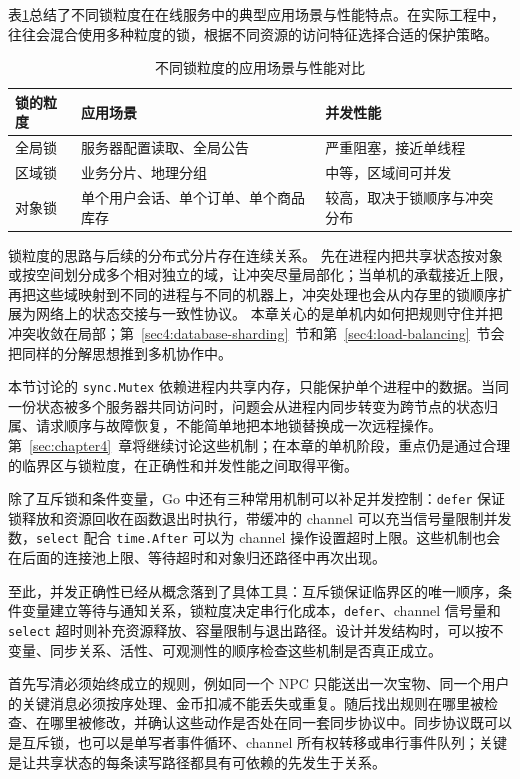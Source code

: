 表\ref{tab:lock-granularity}总结了不同锁粒度在在线服务中的典型应用场景与性能特点。在实际工程中，往往会混合使用多种粒度的锁，根据不同资源的访问特征选择合适的保护策略。

\begin{table}[H]
\centering
\caption{不同锁粒度的应用场景与性能对比}
\label{tab:lock-granularity}
\begin{tabular}{p{3cm}p{5cm}p{4cm}}
\hline
锁的粒度 & 应用场景 & 并发性能 \\
\hline
全局锁 & 服务器配置读取、全局公告 & 严重阻塞，接近单线程 \\
区域锁 & 业务分片、地理分组 & 中等，区域间可并发 \\
对象锁 & 单个用户会话、单个订单、单个商品库存 & 较高，取决于锁顺序与冲突分布 \\
\hline
\end{tabular}
\end{table}

锁粒度的思路与后续的分布式分片存在连续关系。
先在进程内把共享状态按对象或按空间划分成多个相对独立的域，让冲突尽量局部化；当单机的承载接近上限，再把这些域映射到不同的进程与不同的机器上，冲突处理也会从内存里的锁顺序扩展为网络上的状态交接与一致性协议。
本章关心的是单机内如何把规则守住并把冲突收敛在局部；第~\ref{sec4:database-sharding}~节和第~\ref{sec4:load-balancing}~节会把同样的分解思想推到多机协作中。

本节讨论的 \texttt{sync.Mutex} 依赖进程内共享内存，只能保护单个进程中的数据。当同一份状态被多个服务器共同访问时，问题会从进程内同步转变为跨节点的状态归属、请求顺序与故障恢复，不能简单地把本地锁替换成一次远程操作。第~\ref{sec:chapter4}~章将继续讨论这些机制；在本章的单机阶段，重点仍是通过合理的临界区与锁粒度，在正确性和并发性能之间取得平衡。

除了互斥锁和条件变量，Go 中还有三种常用机制可以补足并发控制：\texttt{defer} 保证锁释放和资源回收在函数退出时执行，带缓冲的 channel 可以充当信号量限制并发数，\texttt{select} 配合 \texttt{time.After} 可以为 channel 操作设置超时上限。这些机制也会在后面的连接池上限、等待超时和对象归还路径中再次出现。

至此，并发正确性已经从概念落到了具体工具：互斥锁保证临界区的唯一顺序，条件变量建立等待与通知关系，锁粒度决定串行化成本，\texttt{defer}、channel 信号量和 \texttt{select} 超时则补充资源释放、容量限制与退出路径。设计并发结构时，可以按不变量、同步关系、活性、可观测性的顺序检查这些机制是否真正成立。

首先写清必须始终成立的规则，例如同一个 NPC 只能送出一次宝物、同一个用户的关键消息必须按序处理、金币扣减不能丢失或重复。随后找出规则在哪里被检查、在哪里被修改，并确认这些动作是否处在同一套同步协议中。同步协议既可以是互斥锁，也可以是单写者事件循环、channel 所有权转移或串行事件队列；关键是让共享状态的每条读写路径都具有可依赖的先发生于关系。

